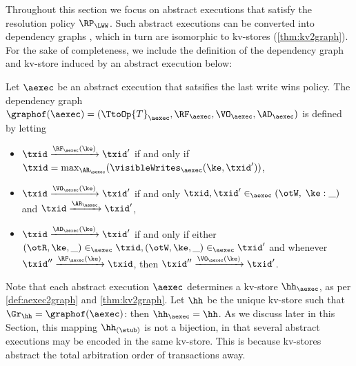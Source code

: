 Throughout this section we focus on abstract executions that satisfy the 
resolution policy $\RP_{\LWW}$.
Such abstract executions can be converted into dependency graphs \cite{SIanaysis,laws}, 
which in turn are isomorphic to kv-stores (\cref{thm:kv2graph}). For the sake of completeness, 
we include the definition of the dependency graph and kv-store induced by an abstract execution below: 

\begin{definition}
\label{def:aexec2graph}
Let $\aexec$ be an abstract execution that satsifies the last write wins policy. 
The dependency graph $\graphof(\aexec) = (\TtoOp{T}_{\aexec}, \RF_{\aexec}, 
\VO_{\aexec}, \AD_{\aexec})$ is defined by letting
\begin{itemize}
\item $\txid \xrightarrow{\RF_{\aexec}(\ke)} \txid'$ if and only if 
$\txid = \max_{\AR_{\aexec}}(\visibleWrites_{\aexec}(\ke, \txid'))$, 
\item $\txid \xrightarrow{\VO_{\aexec}(\ke)} \txid'$ if and only 
$\txid, \txid' \in_{\aexec} (\otW, \;\ke: \_)$ 
and $\txid \xrightarrow{\AR_{\aexec}} \txid'$,
\item $\txid \xrightarrow{\AD_{\aexec}(\ke)} \txid'$ if and only if either 
$(\otR, \ke, \_) \in_{\aexec} \txid, (\otW, \ke, \_) \in_{\aexec} \txid'$ and 
whenever $\txid'' \xrightarrow{\RF_{\aexec}(\ke)} \txid$, 
then $\txid'' \xrightarrow{\VO_{\aexec}(\ke)} \txid'$.
\end{itemize}
\end{definition}
Note that each abstract execution $\aexec$ determines a kv-store 
$\hh_{\aexec}$, as per \cref{def:aexec2graph} and \cref{thm:kv2graph}. 
Let $\hh$ be the unique kv-store such that $\Gr_{\hh} = \graphof(\aexec)$: then 
$\hh_{\aexec} = \hh$. As we discuss later in this Section, this mapping 
$\hh_{(\stub)}$ is not a bijection, in that several abstract executions may be 
encoded in the same kv-store. This is because kv-stores abstract the total 
arbitration order of transactions away.


